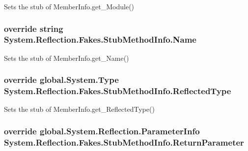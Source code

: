 Sets the stub of Member\-Info.\-get\-\_\-\-Module()

\hypertarget{class_system_1_1_reflection_1_1_fakes_1_1_stub_method_info_a23add8460769e95b9e66d85d6ff116f2}{
\subsubsection[{Name}]{\setlength{\rightskip}{0pt plus 5cm}override string System.\-Reflection.\-Fakes.\-Stub\-Method\-Info.\-Name\hspace{0.3cm}{\ttfamily [get]}}}\label{class_system_1_1_reflection_1_1_fakes_1_1_stub_method_info_a23add8460769e95b9e66d85d6ff116f2}


Sets the stub of Member\-Info.\-get\-\_\-\-Name()

\hypertarget{class_system_1_1_reflection_1_1_fakes_1_1_stub_method_info_a900d45b6603f7d99cdc0db9f4550e41c}{
\subsubsection[{Reflected\-Type}]{\setlength{\rightskip}{0pt plus 5cm}override global.\-System.\-Type System.\-Reflection.\-Fakes.\-Stub\-Method\-Info.\-Reflected\-Type\hspace{0.3cm}{\ttfamily [get]}}}\label{class_system_1_1_reflection_1_1_fakes_1_1_stub_method_info_a900d45b6603f7d99cdc0db9f4550e41c}


Sets the stub of Member\-Info.\-get\-\_\-\-Reflected\-Type()

\hypertarget{class_system_1_1_reflection_1_1_fakes_1_1_stub_method_info_a5599a51d94fd18e014da4c98f3b340a8}{
\subsubsection[{Return\-Parameter}]{\setlength{\rightskip}{0pt plus 5cm}override global.\-System.\-Reflection.\-Parameter\-Info System.\-Reflection.\-Fakes.\-Stub\-Method\-Info.\-Return\-Parameter\hspace{0.3cm}{\ttfamily [get]}}}\label{class_system_1_1_reflection_1_1_fakes_1_1_stub_method_info_a5599a51d94fd18e014da4c98f3b340a8}


